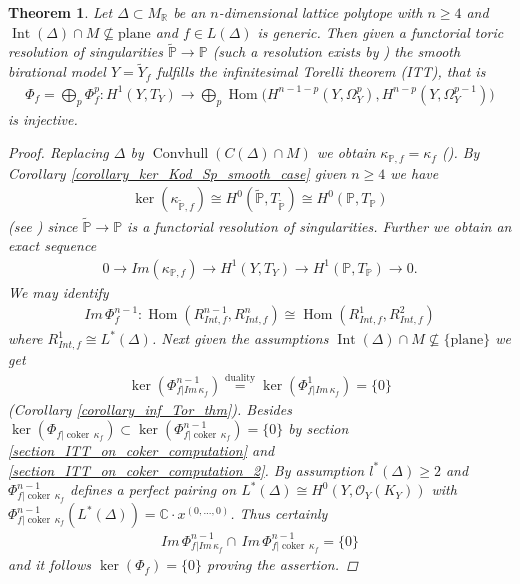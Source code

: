 \documentclass[12pt, english]{article}
\newtheorem{theorem}[definition]{Theorem}
\DeclareMathOperator{\Hom}{Hom}
\DeclareMathOperator{\coker}{coker}
\DeclareMathOperator{\Int}{Int}
\DeclareMathOperator{\Convhull}{Convhull}
\begin{document}
\begin{theorem}
	Let $\Delta \subset M_{\mathbb{R}}$ be an $n$-dimensional lattice polytope with $n \geq 4$ and $\Int(\Delta) \cap M \nsubseteq \textrm{plane}$ and $f \in L(\Delta)$ is generic. Then given a functorial toric resolution of singularities $\tilde{\mathbb{P}} \rightarrow \mathbb{P}$ (such a resolution exists by \cite[Rem.2.3.10]{Wlo26}) the smooth birational model $Y = \tilde{Y}_f$ fulfills the infinitesimal Torelli theorem (ITT), that is
	\begin{align*}
		\Phi_f = \bigoplus_p \Phi_f^p: H^1(Y,T_Y) \rightarrow \bigoplus_{p} \Hom \Big( H^{n-1-p}(Y, \Omega_Y^p), H^{n-p}(Y, \Omega_Y^{p-1}) \Big)
	\end{align*}
	is injective. 
	
	\begin{proof}
		Replacing $\Delta$ by $\Convhull(C(\Delta) \cap M)$ we obtain $\kappa_{\mathbb{P},f} = \kappa_f$ (\cite[Prop.9.2]{Gie22}). By Corollary \ref{corollary_ker_Kod_Sp_smooth_case} given $n \geq 4$ we have 
		\begin{align*}
			\ker(\kappa_{\tilde{\mathbb{P}},f}) \cong H^0(\tilde{\mathbb{P}}, T_{\tilde{\mathbb{P}}}) \cong H^0(\mathbb{P}, T_{\mathbb{P}})
		\end{align*}
		(see \cite[Cor.4.7]{GKK10}) since $\tilde{\mathbb{P}} \rightarrow \mathbb{P}$ is a functorial resolution of singularities. Further we obtain an exact sequence
		\begin{align*}
			0 \rightarrow Im(\kappa_{\mathbb{P},f}) \rightarrow H^1(Y, T_{Y}) \rightarrow H^1(\mathbb{P}, T_{\mathbb{P}}) \rightarrow 0.
		\end{align*}
		We may identify 
		\begin{align*}
			Im \, \Phi_f^{n-1}: \Hom(R_{Int,f}^{n-1}, R_{Int,f}^n) \cong \Hom(R_{Int,f}^1, R_{Int,f}^2)
		\end{align*}
		where $R_{Int,f}^1 \cong L^*(\Delta)$. Next given the assumptions $\Int(\Delta) \cap M \nsubseteq \{ \textrm{plane}\}$ we get
		\begin{align*}
			\ker(\Phi_{f \vert{Im \, \kappa_f}}^{n-1}) \overset{\textrm{duality}}{=} \ker(\Phi_{f \vert{Im \, \kappa_f}}^{1}) = \{0\}
		\end{align*}
		(Corollary \ref{corollary_inf_Tor_thm}). Besides $\ker(\Phi_{f \vert{\coker \, \kappa_f}}) \subset \ker( \Phi_{f \vert{\coker \, \kappa_f}}^{n-1}) = \{0\}$ by section \ref{section_ITT_on_coker_computation} and \ref{section_ITT_on_coker_computation_2}. By assumption $l^*(\Delta) \geq 2$ and $\Phi_{f \vert{\coker \, \kappa_f}}^{n-1}$ defines a perfect pairing on $L^*(\Delta) \cong H^0(Y,\mathcal{O}_Y(K_Y))$ with $\Phi_{f \vert{\coker \, \kappa_f}}^{n-1}(L^*(\Delta)) = \mathbb{C} \cdot x^{(0,...,0)}$. Thus certainly
		\begin{align*}
			Im \, \Phi_{f \vert{Im \, \kappa_{f}}}^{n-1} \cap \, Im \, \Phi_{f \vert{\coker \, \kappa_f}}^{n-1} = \{0\}
		\end{align*}
		and it follows $\ker(\Phi_f) = \{0\}$ proving the assertion.
	\end{proof}
	

\end{theorem}
\end{document}

